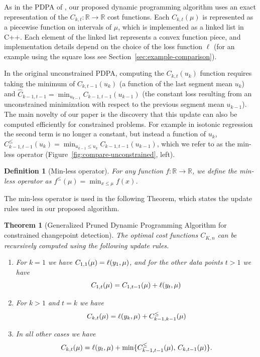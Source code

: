 \documentclass{article}
\newtheorem{theorem}{Theorem}
\newtheorem{definition}{Definition}
\newcommand{\RR}{\mathbb R}
\begin{document}
As in the PDPA of \citet{pruned-dp}, our proposed dynamic programming
algorithm uses an exact representation of the
$C_{k,t}:\RR\rightarrow\RR$ cost functions. Each $C_{k,t}(\mu)$ is
represented as a piecewise function on intervals of $\mu$, which is
implemented as a linked list in C++. Each element of the linked list
represents a convex function piece, and implementation details depend
on the choice of the loss function $\ell$ (for an example using the
square loss see Section~\ref{sec:example-comparison}).

In the original unconstrained PDPA, computing the $C_{k,t}(u_k)$
function requires taking the minimum of $C_{k,t-1}(u_k)$ (a function
of the last segment mean $u_k$) and
$\hat C_{k-1,t-1} = \min_{u_{k-1}} C_{k-1,t-1}(u_{k-1})$ (the constant
loss resulting from an unconstrained minimization with respect to the
previous segment mean $u_{k-1}$). The main novelty of our paper is the
discovery that this update can also be computed efficiently for
constrained problems. For example in isotonic regression the second
term is no longer a constant, but instead a function of $u_k$,
$C_{k-1,t-1}^{\leq}(u_k) = \min_{u_{k-1}\leq u_k}
C_{k-1,t-1}(u_{k-1})$, which we refer to as the min-less operator
(Figure~\ref{fig:compare-unconstrained}, left).

\begin{definition}[Min-less operator]
  For any function $f:\RR\rightarrow\RR$, we define the min-less
  operator as $f^\leq(\mu)=\min_{x\leq \mu} f(x)$.
\end{definition}

The min-less operator is used in the following Theorem, which states
the update rules used in our proposed algorithm.

\begin{theorem}[Generalized Pruned Dynamic Programming Algorithm
  for constrained changepoint detection]
  The optimal cost functions $C_{K,n}$ can be recursively computed
  using the following update rules.
\begin{enumerate}
\item For $k=1$ we have
$C_{1,1}(\mu)=\ell(y_1,\mu)$, and for the other data
  points $t>1$ we have
\begin{equation}
C_{1,t}(\mu)=C_{1,t-1}(\mu)+\ell(y_t,\mu)
\end{equation}
\item For $k>1$ and $t=k$ we have
\begin{equation}
  C_{k,t}(\mu)=\ell(y_k, \mu)+C_{k-1,k-1}^\leq(\mu)
\end{equation}
\item In all other cases we have
  \begin{equation}
  C_{k,t}(\mu)=\ell(y_t,\mu)+
  \min\{
  C_{k-1,t-1}^\leq(\mu),\,
  C_{k,t-1}(\mu)
  \}.
  \end{equation}
\end{enumerate}
\end{theorem}
\end{document}
